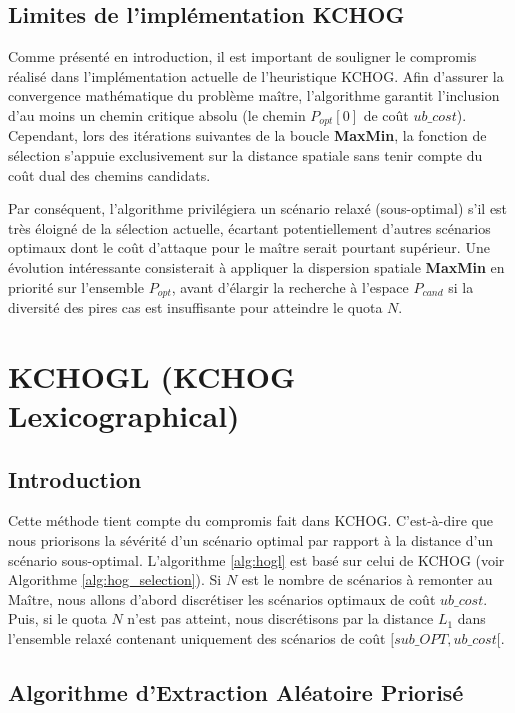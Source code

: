 \documentclass[11pt,a4paper]{article}
\begin{document}
\subsection{Limites de l'implémentation KCHOG}

Comme présenté en introduction, il est important de souligner le compromis réalisé dans l'implémentation actuelle de l'heuristique KCHOG. Afin d'assurer la convergence mathématique du problème maître, l'algorithme garantit l'inclusion d'au moins un chemin critique absolu (le chemin $P_{opt}[0]$ de coût $ub\_cost$). Cependant, lors des itérations suivantes de la boucle \textbf{MaxMin}, la fonction de sélection s'appuie exclusivement sur la distance spatiale sans tenir compte du coût dual des chemins candidats. 

Par conséquent, l'algorithme privilégiera un scénario relaxé (sous-optimal) s'il est très éloigné de la sélection actuelle, écartant potentiellement d'autres scénarios optimaux dont le coût d'attaque pour le maître serait pourtant supérieur. Une évolution intéressante consisterait à appliquer la dispersion spatiale \textbf{MaxMin} en priorité sur l'ensemble $P_{opt}$, avant d'élargir la recherche à l'espace $P_{cand}$ si la diversité des pires cas est insuffisante pour atteindre le quota $N$.

\newpage
\section{KCHOGL (KCHOG Lexicographical)}
\label{hogl}

\subsection{Introduction}

Cette méthode tient compte du compromis fait dans KCHOG. C'est-à-dire que nous priorisons la sévérité d'un scénario optimal par rapport à la distance d'un scénario sous-optimal. L'algorithme \ref{alg:hogl} est basé sur celui de KCHOG (voir Algorithme \ref{alg:hog_selection}). Si $N$ est le nombre de scénarios à remonter au Maître, nous allons d'abord discrétiser les scénarios optimaux de coût $ub\_cost$. Puis, si le quota $N$ n'est pas atteint, nous discrétisons par la distance $L_1$ dans l'ensemble relaxé contenant uniquement des scénarios de coût $[sub\_OPT, ub\_cost[$.

\subsection{Algorithme d'Extraction Aléatoire Priorisé}
\end{document}
